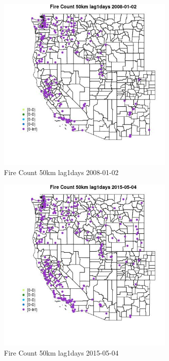 \begin{figure} 
\centering  
\includegraphics[width=0.77\textwidth]{Code_Outputs/Report_ML_input_PM25_Step4_part_e_de_duplicated_aves_compiled_2019-05-18wNAs_MapObsFire_Count_50km_lag1days2008-01-02.jpg} 
\caption{\label{fig:Report_ML_input_PM25_Step4_part_e_de_duplicated_aves_compiled_2019-05-18wNAsMapObsFire_Count_50km_lag1days2008-01-02}Fire Count 50km lag1days 2008-01-02} 
\end{figure} 
 

\clearpage 

\begin{figure} 
\centering  
\includegraphics[width=0.77\textwidth]{Code_Outputs/Report_ML_input_PM25_Step4_part_e_de_duplicated_aves_compiled_2019-05-18wNAs_MapObsFire_Count_50km_lag1days2015-05-04.jpg} 
\caption{\label{fig:Report_ML_input_PM25_Step4_part_e_de_duplicated_aves_compiled_2019-05-18wNAsMapObsFire_Count_50km_lag1days2015-05-04}Fire Count 50km lag1days 2015-05-04} 
\end{figure} 
 

